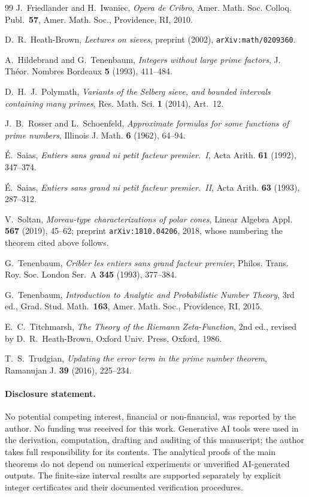 \documentclass[11pt,a4paper]{article}
\theoremstyle{plain}
\theoremstyle{definition}
\theoremstyle{remark}
\begin{document}
\begin{thebibliography}{99}
J.~Friedlander and H.~Iwaniec,
\emph{Opera de Cribro},
Amer. Math. Soc. Colloq. Publ.\ \textbf{57}, Amer. Math. Soc., Providence, RI, 2010.

D.~R.~Heath-Brown,
\emph{Lectures on sieves},
preprint (2002), \texttt{arXiv:math/0209360}.

A.~Hildebrand and G.~Tenenbaum,
\emph{Integers without large prime factors},
J. Th\'eor. Nombres Bordeaux \textbf{5} (1993), 411--484.

D.~H.~J.~Polymath,
\emph{Variants of the Selberg sieve, and bounded intervals containing many primes},
Res. Math. Sci. \textbf{1} (2014), Art.~12.

J.~B.~Rosser and L.~Schoenfeld,
\emph{Approximate formulas for some functions of prime numbers},
Illinois J. Math. \textbf{6} (1962), 64--94.

\'E.~Saias,
\emph{Entiers sans grand ni petit facteur premier.\ I},
Acta Arith. \textbf{61} (1992), 347--374.

\'E.~Saias,
\emph{Entiers sans grand ni petit facteur premier.\ II},
Acta Arith. \textbf{63} (1993), 287--312.

V.~Soltan,
\emph{Moreau-type characterizations of polar cones},
Linear Algebra Appl. \textbf{567} (2019), 45--62;
preprint \texttt{arXiv:1810.04206}, 2018, whose numbering the theorem cited above follows.

G.~Tenenbaum,
\emph{Cribler les entiers sans grand facteur premier},
Philos. Trans. Roy. Soc. London Ser.~A \textbf{345} (1993), 377--384.

G.~Tenenbaum,
\emph{Introduction to Analytic and Probabilistic Number Theory},
3rd ed., Grad. Stud. Math.\ \textbf{163}, Amer. Math. Soc., Providence, RI, 2015.

E.~C.~Titchmarsh,
\emph{The Theory of the Riemann Zeta-Function},
2nd ed., revised by D.~R.~Heath-Brown, Oxford Univ. Press, Oxford, 1986.

T.~S.~Trudgian,
\emph{Updating the error term in the prime number theorem},
Ramanujan J. \textbf{39} (2016), 225--234.

\end{thebibliography}

\paragraph{Disclosure statement.} No potential competing interest, financial or non-financial, was
reported by the author. No funding was received for this work.
Generative AI tools were used in the derivation, computation, drafting and
auditing of this manuscript; the author takes full responsibility for its
contents. The analytical proofs of the main theorems do not depend on numerical experiments or unverified AI-generated outputs.
The finite-size interval results are supported separately by explicit integer certificates and their documented verification procedures.
\end{document}
